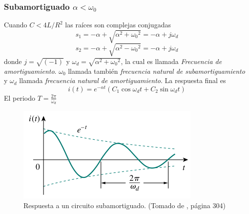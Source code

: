 \documentclass[twocolumn]{IEEEtran}
\begin{document}
\subsubsection*{Subamortiguado $\alpha < \omega _0$}
\noindent
Cuando $C < 4L/{R^2}$ las raíces son complejas conjugadas
\begin{equation}
 {s_1} =  - \alpha  + \sqrt {{\alpha ^2} + {\omega _0}^2}  =  - \alpha  + j{\omega _d}
\end{equation}
\begin{equation}
 {s_2} =  - \alpha  + \sqrt {{\alpha ^2} - {\omega _0}^2}  =  - \alpha  + j{\omega _d}
\end{equation}
\noindent
donde $j=\sqrt{(-1)}$ y $\omega _d = \sqrt {{\alpha ^2} + {\omega _0}^2}$, la cual es llamada \textit{Frecuencia de amortiguamiento}. $\omega _0$ llamada también \textit{frecuencia natural de subamortiguamiento} y $\omega _d$ llamada \textit{frecuencia natural de amortiguamiento}. La respuesta final es
\begin{equation}
 i(t) = {e^{ - \alpha t}}\left( {{C_1}\cos {\omega _d}t + {C_2}\sin {\omega _d}t} \right)
\end{equation}
\noindent
El periodo $T= \frac{2\pi}{\omega _d}$
\begin{figure}[H]
	\centering
		\includegraphics[scale=0.5]{sub.png}
	\caption{Respuesta a un circuito subamortiguado. (Tomado de \cite{sadiku}, página 304)}
	\label{subamortiguado}
\end{figure}
\end{document}
